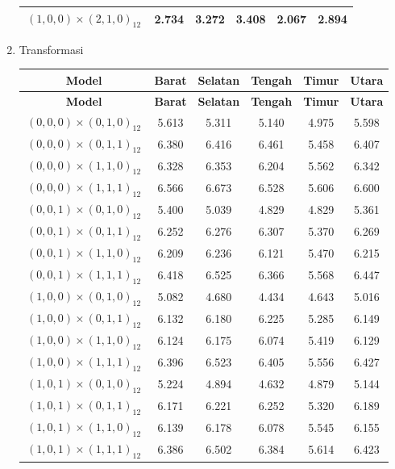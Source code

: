 \begin{enumerate}[label=\alph*.]
\begin{longtable}{|c|c|c|c|c|c|}
        $\,(1,0,0)\times(2,1,0)_{12}\,$ & 2.734 & 3.272 & 3.408 & 2.067 & 2.894 \\ \hline

        \end{longtable}

    \item Transformasi
        \begin{longtable}{|c|c|c|c|c|c|}
        \hline
        \textbf{Model} & \textbf{Barat} & \textbf{Selatan} & \textbf{Tengah} & \textbf{Timur} & \textbf{Utara} \\
        \hline
        \endfirsthead

        \hline
        \textbf{Model} & \textbf{Barat} & \textbf{Selatan} & \textbf{Tengah} & \textbf{Timur} & \textbf{Utara} \\
        \hline
        \endhead

        $\,(0,0,0)\times(0,1,0)_{12}\,$ & 5.613 & 5.311 & 5.140 & 4.975 & 5.598 \\ \hline
        $\,(0,0,0)\times(0,1,1)_{12}\,$ & 6.380 & 6.416 & 6.461 & 5.458 & 6.407 \\ \hline
        $\,(0,0,0)\times(1,1,0)_{12}\,$ & 6.328 & 6.353 & 6.204 & 5.562 & 6.342 \\ \hline
        $\,(0,0,0)\times(1,1,1)_{12}\,$ & 6.566 & 6.673 & 6.528 & 5.606 & 6.600 \\ \hline

        $\,(0,0,1)\times(0,1,0)_{12}\,$ & 5.400 & 5.039 & 4.829 & 4.829 & 5.361 \\ \hline
        $\,(0,0,1)\times(0,1,1)_{12}\,$ & 6.252 & 6.276 & 6.307 & 5.370 & 6.269 \\ \hline
        $\,(0,0,1)\times(1,1,0)_{12}\,$ & 6.209 & 6.236 & 6.121 & 5.470 & 6.215 \\ \hline
        $\,(0,0,1)\times(1,1,1)_{12}\,$ & 6.418 & 6.525 & 6.366 & 5.568 & 6.447 \\ \hline

        $\,(1,0,0)\times(0,1,0)_{12}\,$ & 5.082 & 4.680 & 4.434 & 4.643 & 5.016 \\ \hline
        $\,(1,0,0)\times(0,1,1)_{12}\,$ & 6.132 & 6.180 & 6.225 & 5.285 & 6.149 \\ \hline
        $\,(1,0,0)\times(1,1,0)_{12}\,$ & 6.124 & 6.175 & 6.074 & 5.419 & 6.129 \\ \hline
        $\,(1,0,0)\times(1,1,1)_{12}\,$ & 6.396 & 6.523 & 6.405 & 5.556 & 6.427 \\ \hline

        $\,(1,0,1)\times(0,1,0)_{12}\,$ & 5.224 & 4.894 & 4.632 & 4.879 & 5.144 \\ \hline
        $\,(1,0,1)\times(0,1,1)_{12}\,$ & 6.171 & 6.221 & 6.252 & 5.320 & 6.189 \\ \hline
        $\,(1,0,1)\times(1,1,0)_{12}\,$ & 6.139 & 6.178 & 6.078 & 5.545 & 6.155 \\ \hline
        $\,(1,0,1)\times(1,1,1)_{12}\,$ & 6.386 & 6.502 & 6.384 & 5.614 & 6.423 \\ \hline


\end{longtable}
\end{enumerate}
